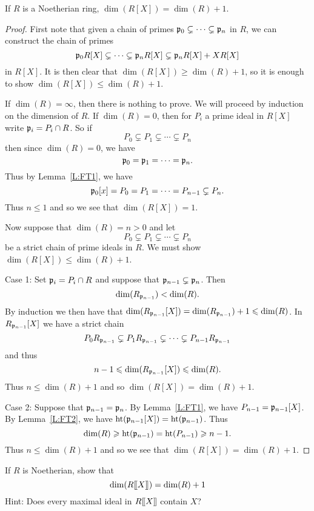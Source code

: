\documentclass{ximera}
\begin{document}
\begin{theorem}
  If $R$ is a Noetherian ring, $\dim(R[X]) = \dim(R) + 1$.
  \begin{proof}
    First note that given a chain of primes $\mathfrak{p}_0 \subsetneq \cdots
    \subsetneq \mathfrak{p}_n$ in $R$, we can construct the chain of primes
    \[
    \mathfrak{p}_0 R[X] \subsetneq \cdots \subsetneq \mathfrak{p}_n R[X] \subsetneq \mathfrak{p}_n
    R[X] + X R[X]
    \]
    in $R[X]$.  It is then clear that $\dim(R[X]) \ge \dim(R) + 1$, so
    it is enough to show $\dim(R[X]) \le\dim(R) + 1$.


    If $\dim(R) = \infty$, then there is nothing to prove. We will
    proceed by induction on the dimension of $R$. If $\dim(R) = 0$,
    then for $P_i$ a prime ideal in $R[X]$ write $\mathfrak{p}_i = P_i\cap R$.
    So if
    \[
    P_0\subsetneq P_1\subsetneq \cdots \subsetneq P_n
    \]
    then since $\dim(R) = 0$, we have
    \[
    \mathfrak{p}_0 = \mathfrak{p}_1 = \cdots = \mathfrak{p}_n.
    \]
    Thus by Lemma~\ref{L:FT1}, we have 
    \[
    \mathfrak{p}_0[x] = P_0 = P_1 = \cdots = P_{n-1}\subsetneq P_n.
    \]
    Thus $n\le 1$ and so we see that $\dim(R[X]) = 1$.
    
    Now suppose that $\dim(R) = n >0$ and let
    \[
    P_0 \subsetneq P_1 \subsetneq \cdots \subsetneq P_n
    \]
    be a strict chain of prime ideals in $R$. We must show $\dim(R[X])
    \le\dim(R) + 1$.


    
    
    Case 1: Set $\mathfrak{p}_i = P_i \cap R$ and suppose that $\mathfrak{p}_{n-1}
    \subsetneq \mathfrak{p}_n$. Then
    \[
    \dim(R_{\mathfrak{p}_{n-1}})< \dim(R).
    \]
    By induction we then have that $\dim(R_{\mathfrak{p}_{n-1}}[X]) =
    \dim(R_{\mathfrak{p}_{n-1}})+1\leqslant \dim(R)$. In $R_{\mathfrak{p}_{n-1}}[X]$ we have a
    strict chain
    \[
    P_0R_{\mathfrak{p}_{n-1}} \subsetneq P_1R_{\mathfrak{p}_{n-1}} \subsetneq \cdots
    \subsetneq P_{n-1}R_{\mathfrak{p}_{n-1}}
    \] 
    and thus 
    \[
    n-1 \leqslant \dim(R_{\mathfrak{p}_{n-1}}[X])\leqslant \dim(R).
    \]
    Thus $n \le\dim(R) +1$ and so  $\dim(R[X]) = \dim(R) + 1$.
    
    Case 2: Suppose that $\mathfrak{p}_{n-1} = \mathfrak{p}_n$. By Lemma~\ref{L:FT1}, we
    have $P_{n-1} = \mathfrak{p}_{n-1}[X]$.  By Lemma~\ref{L:FT2}, we have
    $\operatorname{ht}(\mathfrak{p}_{n-1}[X])=\operatorname{ht}(\mathfrak{p}_{n-1})$.  Thus
    \[
    \dim(R) \geqslant \operatorname{ht}(\mathfrak{p}_{n-1}) = \operatorname{ht}(P_{n-1}) \geqslant n-1.
    \]
    Thus $n\le \dim(R) + 1$ and so we see that $\dim(R[X]) = \dim(R) +1$.
  \end{proof}
\end{theorem}


\begin{exercise}
  If $R$ is Noetherian, show that
  \[
  \dim(R[\hspace{-0.25ex}[ X ]\hspace{-0.25ex}]) = \dim(R) + 1
  \]
  Hint: Does every maximal ideal in $R[\hspace{-0.25ex}[ X ]\hspace{-0.25ex}]$ contain $X$?
\end{exercise}
\end{document}
